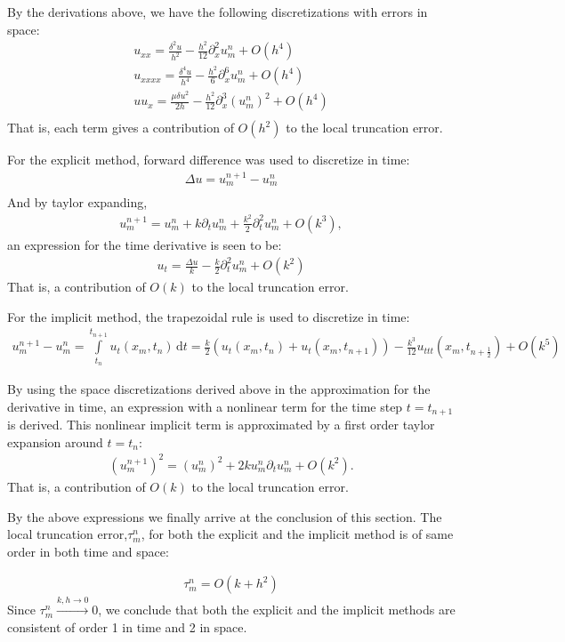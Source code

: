 By the derivations above, we have the following discretizations with errors in space:
\begin{align*}
u_{xx} = \frac{\delta^2 u}{h^2} - \frac{h^2}{12}\partial_{x}^2u_m^n + O(h^4) \\
u_{xxxx} = \frac{\delta^4 u}{h^4} - \frac{h^2}{6}\partial_{x}^6u_m^n + O(h^4) \\
uu_{x} = \frac{\mu \delta u^2}{2h} - \frac{h^2}{12}\partial_{x}^3(u_m^n)^2 + O(h^4) \\
\end{align*}
That is, each term gives a contribution of $O(h^2)$ to the local truncation error.

For the explicit method, forward difference was used to discretize in time:
\begin{align*}
\Delta u = u_m^{n+1}-u_m^n \\
\end{align*}
And by taylor expanding,
\begin{align*}
u_m^{n+1} = u_m^n + k\partial_tu_m^n + \frac{k^2}{2}\partial_t^2u_m^n + O(k^3),
\end{align*}
an expression for the time derivative is seen to be:
\begin{align*}
u_t = \frac{\Delta u}{k} - \frac{k}{2}\partial_t^2u_m^n + O(k^2)
\end{align*}
That is, a contribution of $O(k)$ to the local truncation error.

For the implicit method, the trapezoidal rule is used to discretize in time:
\begin{align*}
u_{m}^{n+1} - u_m^n = \int\limits_{t_{n}}^{t_{n+1}} u_{t}(x_{m},t_{n})\, \mathrm{d}t = \frac{k}{2}(u_t(x_m,t_n) + u_t(x_m,t_{n+1})) - \frac{k^3}{12}u_{ttt}(x_m,t_{n+\frac{1}{2}}) + O(k^5)
\end{align*}

By using the space discretizations derived above in the approximation for the derivative in time, an expression with a nonlinear term for the time step $t=t_{n+1}$ is derived. This nonlinear implicit term is approximated by a first order taylor expansion around $t=t_{n}$:
\begin{align*}
(u_m^{n+1})^2 = (u_m^n)^2 + 2ku_m^n\partial_tu_m^n + O(k^2).
\end{align*}
That is, a contribution of $O(k)$ to the local truncation error.

By the above expressions we finally arrive at the conclusion of this section. The local truncation error,$\tau_m^n$, for both the explicit and the implicit method is of same order in both time and space:

\begin{align*}
\tau_m^n = O(k + h^2)
\end{align*}
Since $\tau_m^n \xrightarrow{k,h \to 0} 0$, we conclude that both the explicit and the implicit methods are consistent of order 1 in time and 2 in space.

